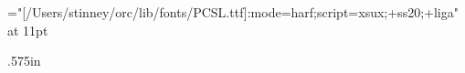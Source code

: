 \font\pczatu="[/Users/stinney/orc/lib/fonts/PCSL.ttf]:mode=harf;script=xsux;+ss20;+liga" at 11pt

\def\beginzatupcsl{\begin{multicols}{3}%
    \columnseprule.4pt
    \parindent0pt\relax
    \rightskip0pt plus1fil\relax
    \parskip2pt plus1fil minus2pt\relax
}
\def\endzatupcsl{\end{multicols}\clearpage}

\def\zcczatufont{\sansc}
\def\zccsnamefont{\sansc}

\newdimen\zheadwd \zheadwd.575in
\newdimen\zchrht  {}
\def\zentry{\leavevmode\hangindent\zheadwd}
\def\zhead#1{\hboxtomin{\zheadwd}{\zcczatufont#1}}
\def\zpcsl#1{#1\endgraf\goodbreak}
\def\zchrnam#1#2{\hbox{\hbox{\pczatu#1}\kern3pt\hbox{\zccsnamefont#2\hfil}}}
\def\zref#1{{\baselineskip9pt\relax\sansc#1\endgraf}}
\def\zsee#1{\sansc#1\hss}
\def\zcomma{, }
\def\zspace{; }
